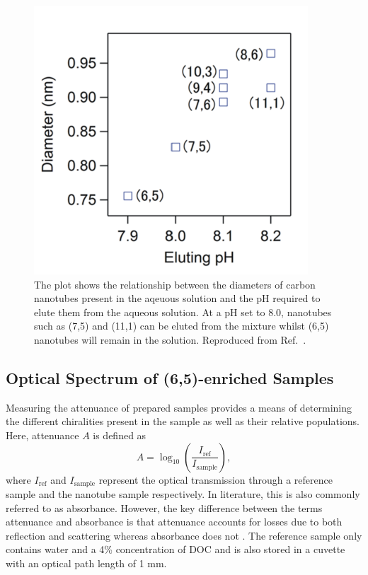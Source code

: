 \begin{figure}[H]
	\centering
	\includegraphics{images/chapter_methods/elute_ph}
	\caption{The plot shows the relationship between the diameters of carbon nanotubes present in the aqeuous solution and the pH required to elute them from the aqueous solution. At a pH set to $8.0$, nanotubes such as (7,5) and (11,1) can be eluted from the mixture whilst (6,5) nanotubes will remain in the solution.  Reproduced from Ref.\ \cite{ichinose2017extraction}.}
	\label{fig:elute_ph}
\end{figure}


\subsection{Optical Spectrum of (6,5)-enriched Samples}

Measuring the attenuance of prepared samples provides a means of determining the different chiralities present in the sample as well as their relative populations. Here, attenuance $A$ is defined as
\begin{equation}
A = \log_{10}\left(\dfrac{I_{\mathrm{ref}}}{I_{\mathrm{sample}}}\right),
\end{equation}
where $I_{\mathrm{ref}}$ and $I_{\mathrm{sample}}$ represent the optical transmission through a reference sample and the nanotube sample respectively. In literature, this is also commonly referred to as absorbance. However, the key difference between the terms attenuance and absorbance is that attenuance accounts for losses due to both reflection and scattering whereas absorbance does not \cite{dixon1992absorbance}. The reference sample only contains water and a 4\% concentration of DOC and is also stored in a cuvette with an optical path length of 1 mm.

